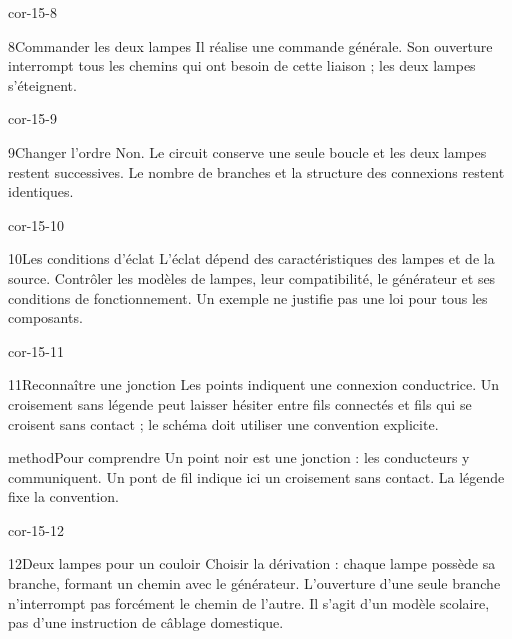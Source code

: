 \documentclass[12pt,twoside,openany]{book}
\begin{document}
\begin{blocLivre}{cor-15-8}
\begin{corrige}{8}{Commander les deux lampes}
Il réalise une commande générale. Son ouverture interrompt tous les chemins qui ont besoin de cette liaison ; les deux lampes s’éteignent.\par
{}
\end{corrige}\end{blocLivre}
\begin{blocLivre}{cor-15-9}
\begin{corrige}{9}{Changer l’ordre}
Non. Le circuit conserve une seule boucle et les deux lampes restent successives. Le nombre de branches et la structure des connexions restent identiques.\par
\end{corrige}\end{blocLivre}
\begin{blocLivre}{cor-15-10}
\begin{corrige}{10}{Les conditions d’éclat}
L’éclat dépend des caractéristiques des lampes et de la source. Contrôler les modèles de lampes, leur compatibilité, le générateur et ses conditions de fonctionnement. Un exemple ne justifie pas une loi pour tous les composants.\par
\end{corrige}\end{blocLivre}
\begin{blocLivre}{cor-15-11}
\begin{corrige}{11}{Reconnaître une jonction}
Les points indiquent une connexion conductrice. Un croisement sans légende peut laisser hésiter entre fils connectés et fils qui se croisent sans contact ; le schéma doit utiliser une convention explicite.\par
\begin{pcEncadre}{method}{Pour comprendre}
Un point noir est une jonction : les conducteurs y communiquent. Un pont de fil indique ici un croisement sans contact. La légende fixe la convention.\par
\end{pcEncadre}
\end{corrige}\end{blocLivre}
\begin{blocLivre}{cor-15-12}
\begin{corrige}{12}{Deux lampes pour un couloir}
Choisir la dérivation : chaque lampe possède sa branche, formant un chemin avec le générateur. L’ouverture d’une seule branche n’interrompt pas forcément le chemin de l’autre. Il s’agit d’un modèle scolaire, pas d’une instruction de câblage domestique.\par
\end{corrige}\end{blocLivre}
\end{document}
